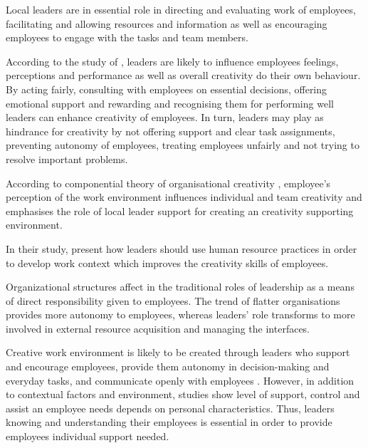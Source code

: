 Local leaders are in essential role in directing and evaluating work of employees, facilitating and allowing resources and information as well as encouraging employees to engage with the tasks and team members. \citep{amabile2004leader}

According to the study of \citet{amabile2004leader}, leaders are likely to influence employees feelings, perceptions and performance as well as overall creativity do their own behaviour. By acting fairly, consulting with employees on essential decisions, offering emotional support and rewarding and recognising them for performing well leaders can enhance creativity of employees. In turn, leaders may play as hindrance for creativity by not offering support and clear task assignments, preventing autonomy of employees, treating employees unfairly and not trying to resolve important problems. 

According to componential theory of organisational creativity \citep{hennessey19881,amabile1996assessing}, employee's perception of the work environment influences individual and team creativity and emphasises the role of local leader support for creating an creativity supporting environment. 

In their study, \citet{shalley2004leaders} present how leaders should use human resource practices in order to develop work context which improves the creativity skills of employees. 

Organizational structures affect in the traditional roles of leadership as a means of direct responsibility given to employees. The trend of flatter organisations provides more autonomy to employees, whereas leaders' role transforms to more involved in external resource acquisition and managing the interfaces. \citep{shalley2004leaders}

Creative work environment is likely to be created through leaders who support and encourage employees, provide them autonomy in decision-making and everyday tasks, and communicate openly with employees \citep{oldham1996employee,tierney1999examination}. However, in addition to contextual factors and environment, studies show level of support, control and assist an employee needs depends on personal characteristics. Thus, leaders knowing and understanding their employees is essential in order to provide employees individual support needed. \citep{shalley2004leaders}


